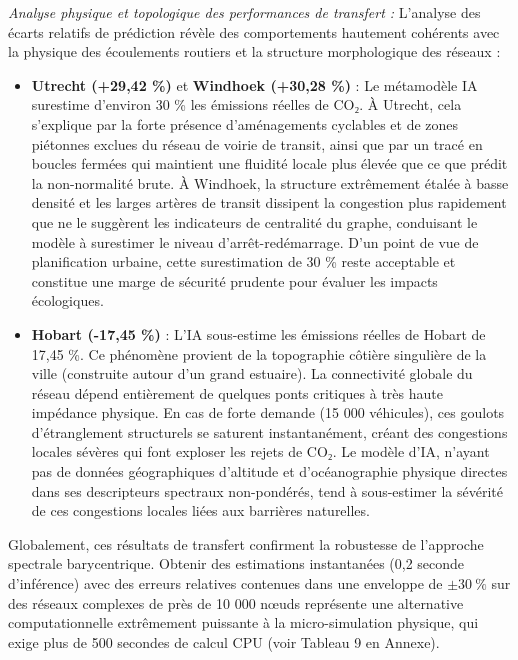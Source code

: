 \documentclass[10pt, a4paper]{article}
\providecommand{\tightlist}{}
\begin{document}
\emph{Analyse physique et topologique des performances de transfert :}
L'analyse des écarts relatifs de prédiction révèle des comportements
hautement cohérents avec la physique des écoulements routiers et la
structure morphologique des réseaux :

\begin{itemize}
\tightlist
\item
  \textbf{Utrecht (+29,42 \%)} et \textbf{Windhoek (+30,28 \%)} : Le
  métamodèle IA surestime d'environ 30 \% les émissions réelles de CO₂.
  À Utrecht, cela s'explique par la forte présence d'aménagements
  cyclables et de zones piétonnes exclues du réseau de voirie de
  transit, ainsi que par un tracé en boucles fermées qui maintient une
  fluidité locale plus élevée que ce que prédit la non-normalité brute.
  À Windhoek, la structure extrêmement étalée à basse densité et les
  larges artères de transit dissipent la congestion plus rapidement que
  ne le suggèrent les indicateurs de centralité du graphe, conduisant le
  modèle à surestimer le niveau d'arrêt-redémarrage. D'un point de vue
  de planification urbaine, cette surestimation de 30 \% reste
  acceptable et constitue une marge de sécurité prudente pour évaluer
  les impacts écologiques.
\item
  \textbf{Hobart (-17,45 \%)} : L'IA sous-estime les émissions réelles
  de Hobart de 17,45 \%. Ce phénomène provient de la topographie côtière
  singulière de la ville (construite autour d'un grand estuaire). La
  connectivité globale du réseau dépend entièrement de quelques ponts
  critiques à très haute impédance physique. En cas de forte demande (15
  000 véhicules), ces goulots d'étranglement structurels se saturent
  instantanément, créant des congestions locales sévères qui font
  exploser les rejets de CO₂. Le modèle d'IA, n'ayant pas de données
  géographiques d'altitude et d'océanographie physique directes dans ses
  descripteurs spectraux non-pondérés, tend à sous-estimer la sévérité
  de ces congestions locales liées aux barrières naturelles.
\end{itemize}

Globalement, ces résultats de transfert confirment la robustesse de
l'approche spectrale barycentrique. Obtenir des estimations instantanées
(0,2 seconde d'inférence) avec des erreurs relatives contenues dans une
enveloppe de \(\pm 30\ \%\) sur des réseaux complexes de près de 10 000
nœuds représente une alternative computationnelle extrêmement puissante
à la micro-simulation physique, qui exige plus de 500 secondes de calcul
CPU (voir Tableau 9 en Annexe).
\end{document}

